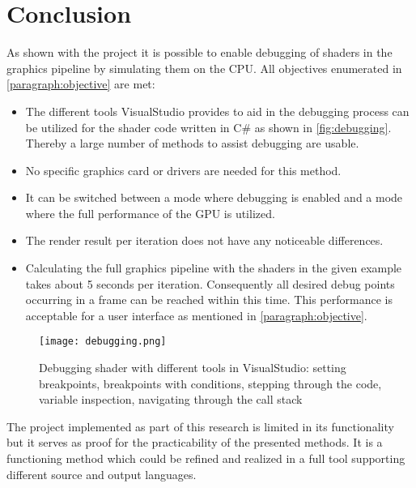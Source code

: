 
\chapter{Conclusion}\label{cha:Conclusion}

As shown with the project  it is possible to enable debugging of shaders in the graphics pipeline by simulating them on the CPU. All objectives enumerated in \autoref{paragraph:objective} are met:

\begin{itemize}
\item The different tools VisualStudio provides to aid in the debugging process can be utilized for the shader code written in C\# as shown in \autoref{fig:debugging}. Thereby a large number of methods to assist debugging are usable.
\item No specific graphics card or drivers are needed for this method. 
\item It can be switched between a mode where debugging is enabled and a mode where the full performance of the GPU is utilized.
\item The render result per iteration does not have any noticeable differences.
\item Calculating the full graphics pipeline with the shaders in the given example takes about 5 seconds per iteration. Consequently all desired debug points occurring in a frame can be reached within this time. This performance is acceptable for a user interface as mentioned in \autoref{paragraph:objective}.
\end{itemize}

\begin{figure}[h!]
  \centering 
  \texttt{[image: debugging.png]}
  \caption[Screenshot of debug screen within VisualStudio]{Debugging shader with different tools in VisualStudio: setting breakpoints, breakpoints with conditions, stepping through the code, variable inspection, navigating through the call stack}
  \label{fig:debugging}
\end{figure}

The project implemented as part of this research is limited in its functionality but it serves as proof for the practicability of the presented methods. It is a functioning method which could be refined and realized in a full tool supporting different source and output languages.



